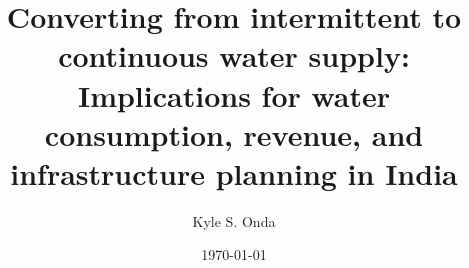 \documentclass[12pt,report]{uncdissertation}
\title{}
\author{}
\date{}
\begin{document}
\title{Converting from intermittent to continuous water supply: Implications for water
consumption, revenue, and infrastructure planning in India}
\author{Kyle S. Onda}
\date{\today}





\pagestyle{plain}

\frontmatter


\maketitlepg
\makecopyrightpage
\makeabstractpg
\makededicationpg




%

% 
\newlength{\oldbaselineskip}
\setlength{\oldbaselineskip}{\the\baselineskip}
\newlength{\oldparskip}
\setlength{\oldparskip}{\the\parskip}

\setlength{\baselineskip}{0.5\oldbaselineskip}
\setlength{\parskip}{0.5\oldbaselineskip}




\renewcommand{\contentsname}{TABLE OF CONTENTS}
\renewcommand{\cfttoctitlefont}{\textbf}
\renewcommand{\cftaftertoctitle}{\hfill}
\renewcommand{\cftdotsep}{1.5}
\cftsetrmarg{1.0in}
\end{document}
